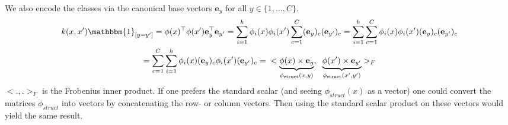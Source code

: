 \documentclass[a4paper]{article}
\newcommand{\e}{\textbf{e}}
\newcommand{\1}{\mathds{1}}
\begin{document}
We also encode the classes via the canonical base vectors 
$\e_y$ for all $y\in \{1,\ldots,C\}$.
\begin{gather*}
	k(x,x')\mathbbm{1}_{[y=y']}
	=
	\phi(x)^\top \phi(x') \e^\top_y \e_{y'}
	=
	\sum_{i=1}^h\phi_{i}(x)\phi_{i}(x')\sum_{c=1}^C(\e_y)_c (\e_{y'})_c
	=
	\sum_{i=1}^h\sum_{c=1}^C\phi_{i}(x)\phi_{i}(x') (\e_y)_c (\e_{y'})_c
	\\
	=
	\sum_{c=1}^C \sum_{i=1}^h \phi_{i}(x)(\e_y)_c \phi_{i}(x') (\e_{y'})_c 	
	=
	\hspace{2mm}
	<
	\underbrace{
		\phi(x)\times \e_y 
	}_{\phi_{\text{struct}}(x,y)}
	,
	\hspace{2mm}
	\underbrace{
	\phi(x')\times \e_{y'}
	}_{\phi_{\text{struct}}(x',y')}
	>_F
\end{gather*}
$<.,.>_F$ is the Frobenius inner product. If one prefers
the standard scalar (and seeing $\phi_{struct}(x)$ as a vector) 
one could convert the matrices $\phi_{struct}$ into 
vectors by concatenating the row- or column vectors. Then using 
the standard scalar product on these vectors would yield the same result. 
  
\end{document}
